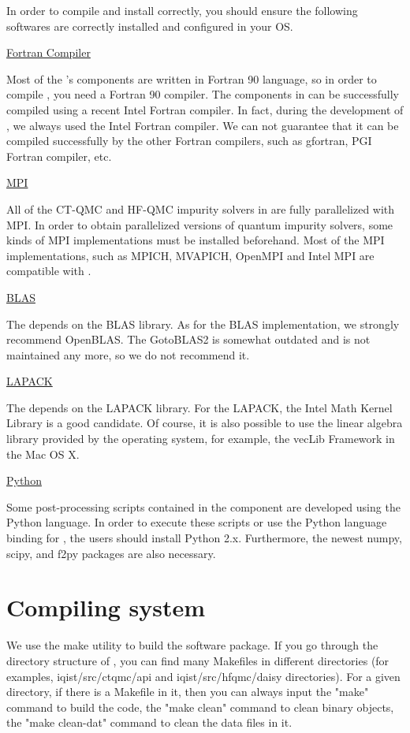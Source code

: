 In order to compile and install {\iqist} correctly, you should ensure the following softwares are correctly installed and configured in your OS.

\underline{Fortran Compiler}

Most of the {\iqist}'s components are written in Fortran 90 language, so in order to compile {\iqist}, you need a Fortran 90 compiler. The components in {\iqist} can be successfully compiled using a recent Intel Fortran compiler. In fact, during the development of {\iqist}, we always used the Intel Fortran compiler. We can not guarantee that it can be compiled successfully by the other Fortran compilers, such as gfortran, PGI Fortran compiler, etc.

\underline{MPI}

All of the CT-QMC and HF-QMC impurity solvers in {\iqist} are fully parallelized with MPI. In order to obtain 
parallelized versions of quantum impurity solvers, some kinds of MPI implementations must be installed beforehand. Most of the MPI implementations, such as MPICH, MVAPICH, OpenMPI and Intel MPI are compatible with {\iqist}.

\underline{BLAS}

The {\iqist} depends on the BLAS library. As for the BLAS implementation, we strongly recommend OpenBLAS. The GotoBLAS2 is somewhat outdated and is not maintained any more, so we do not recommend it.

\underline{LAPACK}

The {\iqist} depends on the LAPACK library. For the LAPACK, the Intel Math Kernel Library is a good candidate. Of course, it is also possible to use the linear algebra library provided by the operating system, for example, the vecLib Framework in the Mac OS X.

\underline{Python}

Some post-processing scripts contained in the {\hibiscus} component are developed using the Python language. In order to execute these scripts or use the Python language binding for {\iqist}, the users should install Python 2.x. Furthermore, the newest numpy, scipy, and f2py packages are also necessary.

\section{Compiling system}

We use the make utility to build the {\iqist} software package. If you go through the directory structure of {\iqist}, you can find many Makefiles in different directories (for examples, iqist/src/ctqmc/api and iqist/src/hfqmc/daisy directories). For a given directory, if there is a Makefile in it, then you can always input the "make" command to build the code, the "make clean" command to clean binary objects, the "make clean-dat" command to clean the data files in it.

